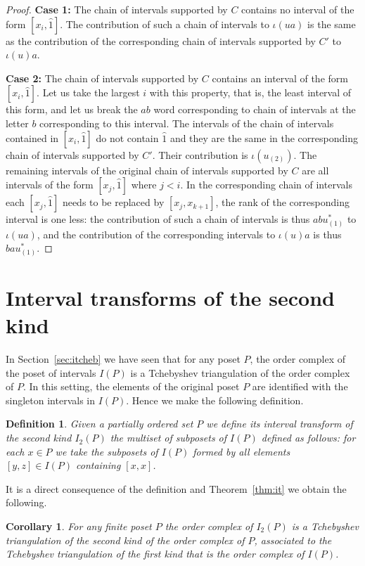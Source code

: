 \documentclass[reqno,12pt]{amsart}
\numberwithin{equation}{section}
\newtheorem{definition}[theorem]{Definition}
\newtheorem{corollary}[theorem]{Corollary}
\newcommand{\0}{\widehat{0}}
\newcommand{\1}{\widehat{1}}
\newcommand{\2}{\widehat{2}}
\newcommand{\II}{I_2}
\newcommand{\iab}{\iota}
\begin{document}
\begin{proof}
{\bf\noindent Case 1:} The chain of intervals supported by $C$ contains
no interval of the form $[x_i,\1]$. The contribution of such a chain of
intervals to $\iab(ua)$ is the same as the contribution of the
corresponding chain of intervals supported by $C'$ to $\iab(u)a$. 


{\bf\noindent Case 2:} The chain of intervals supported by $C$ contains
an interval of the form $[x_i,\1]$. Let us take the largest $i$ with this
property, that is, the least interval of this form, and let us
break the $ab$ word corresponding to chain of intervals at the letter
$b$ corresponding to this interval. The intervals of the
chain of intervals contained in $[x_i,\1]$ do not contain $\1$ and they
are the same in the corresponding chain of intervals supported by
$C'$. Their contribution is $\iab(u_{(2)})$. The remaining intervals
of the original chain of intervals supported by $C$ are all intervals of
the form $[x_j,\1]$ where $j<i$. In the corresponding chain of intervals
each $[x_j,\1]$ needs to be replaced by $[x_j,x_{k+1}]$, the rank of the
corresponding interval is one less: the contribution of such a chain of
intervals is thus $ab u_{(1)}^*$ to $\iab(ua)$, and the contribution of
the corresponding intervals to $\iab(u)a$ is thus $ba u_{(1)}^*$.  
\end{proof}  


\section{Interval transforms of the second kind}
\label{sec:t2}

In Section~\ref{sec:itcheb} we have seen that for any poset $P$, the
order complex of the poset of intervals $I(P)$ is a Tchebyshev
triangulation of the order complex of $P$. In this setting, the elements
of the original poset $P$ are identified with the singleton intervals in
$I(P)$. Hence we make the following definition.

\begin{definition}
Given a partially ordered set $P$ we define its {\em interval transform
  of the second kind $\II(P)$} the multiset of subposets of $I(P)$
defined as follows: for each $x\in P$ we take the subposets of $I(P)$
formed by all elements $[y,z]\in I(P)$ containing $[x,x]$. 
\end{definition}  

It is a direct consequence of the definition and Theorem~\ref{thm:it} we
obtain the following.

\begin{corollary}
\label{cor:iit}
For any finite poset $P$ the order complex of $\II(P)$ is a Tchebyshev
triangulation of the second kind of the order complex of $P$, associated
to the Tchebyshev triangulation of the first kind that is the order
complex of $I(P)$. 
\end{corollary}
\end{document}
